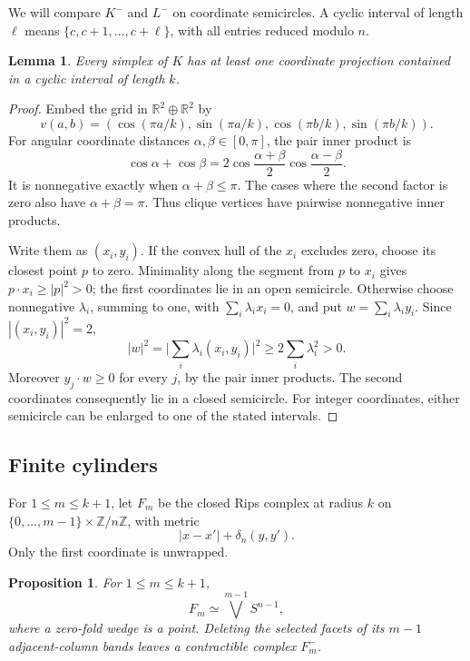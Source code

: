 \documentclass[11pt]{amsart}
\newtheorem{lemma}[theorem]{Lemma}
\newtheorem{proposition}[theorem]{Proposition}
\newcommand{\ZZ}{\mathbb Z}
\begin{document}
We will compare \(K^-\) and \(L^-\) on coordinate semicircles. A cyclic
interval of length \(\ell\) means
\(\{c,c+1,\ldots,c+\ell\}\), with all entries reduced modulo \(n\).

\begin{lemma}\label{lem:semicircle}
Every simplex of \(K\) has at least one coordinate projection contained
in a cyclic interval of length \(k\).
\end{lemma}

\begin{proof}
Embed the grid in \(\mathbb R^2\oplus\mathbb R^2\) by
\[
v(a,b)=
(\cos(\pi a/k),\sin(\pi a/k),
 \cos(\pi b/k),\sin(\pi b/k)).
\]
For angular coordinate distances \(\alpha,\beta\in[0,\pi]\), the pair
inner product is
\[
\cos\alpha+\cos\beta
=2\cos\frac{\alpha+\beta}{2}\cos\frac{\alpha-\beta}{2}.
\]
It is nonnegative exactly when \(\alpha+\beta\leq\pi\).
The cases where the second factor is zero also have
\(\alpha+\beta=\pi\). Thus clique vertices have pairwise nonnegative
inner products.

Write them as \((x_i,y_i)\). If the convex hull of the \(x_i\) excludes
zero, choose its closest point \(p\) to zero. Minimality along the segment
from \(p\) to \(x_i\) gives \(p\cdot x_i\geq |p|^2>0\);
the first coordinates lie in an open semicircle.
Otherwise choose nonnegative \(\lambda_i\), summing to one, with
\(\sum_i\lambda_i x_i=0\), and put \(w=\sum_i\lambda_i y_i\).
Since \(|(x_i,y_i)|^2=2\),
\[
|w|^2=\Big|\sum_i\lambda_i(x_i,y_i)\Big|^2
\geq 2\sum_i\lambda_i^2>0.
\]
Moreover \(y_j\cdot w\geq0\) for every \(j\), by the pair inner products.
The second coordinates consequently lie in a closed semicircle.
For integer coordinates, either semicircle can be enlarged to one of
the stated intervals.
\end{proof}

\subsection*{Finite cylinders}

For \(1\leq m\leq k+1\), let \(F_m\) be the closed Rips complex at radius
\(k\) on
\(\{0,\ldots,m-1\}\times\ZZ/n\ZZ\), with metric
\[
|x-x'|+\delta_n(y,y').
\]
Only the first coordinate is unwrapped.

\begin{proposition}\label{prop:cylinder}
For \(1\leq m\leq k+1\),
\[
F_m\simeq\bigvee^{m-1}S^{n-1},
\]
where a zero-fold wedge is a point. Deleting the selected facets of its
\(m-1\) adjacent-column bands leaves a contractible complex \(F_m^-\).
\end{proposition}
\end{document}
